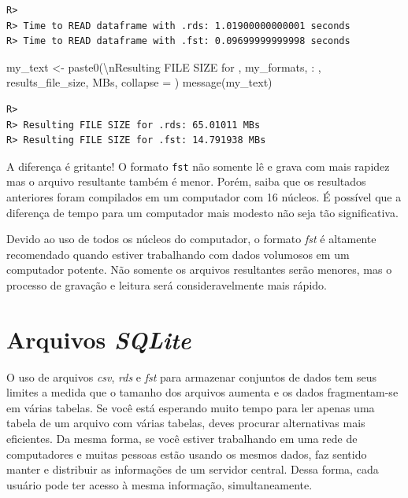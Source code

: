\documentclass[
  11pt,
]{book}
\newenvironment{Shaded}{\begin{snugshade}}{\end{snugshade}}
\newcommand{\AttributeTok}[1]{\textcolor[rgb]{0.61,0.61,0.61}{#1}}
\newcommand{\FunctionTok}[1]{\textcolor[rgb]{0,0,0}{#1}}
\newcommand{\NormalTok}[1]{#1}
\newcommand{\OtherTok}[1]{\textcolor[rgb]{0.37,0.37,0.37}{#1}}
\newcommand{\SpecialCharTok}[1]{\textcolor[rgb]{0,0,0}{#1}}
\newcommand{\StringTok}[1]{\textcolor[rgb]{0.5,0.5,0.5}{#1}}
\newenvironment{rmdimportant}
{\begin{importantblock}

	} {\end{importantblock}}
\begin{document}
\begin{verbatim}
R> 
R> Time to READ dataframe with .rds: 1.01900000000001 seconds
R> Time to READ dataframe with .fst: 0.09699999999998 seconds
\end{verbatim}

\begin{Shaded}
\begin{Highlighting}[]
\NormalTok{my\_text }\OtherTok{\textless{}{-}} \FunctionTok{paste0}\NormalTok{(}\StringTok{\textquotesingle{}}\SpecialCharTok{\textbackslash{}n}\StringTok{Resulting FILE SIZE for \textquotesingle{}}\NormalTok{,}
\NormalTok{                  my\_formats, }\StringTok{\textquotesingle{}: \textquotesingle{}}\NormalTok{,}
\NormalTok{                  results\_file\_size, }\StringTok{\textquotesingle{} MBs\textquotesingle{}}\NormalTok{, }\AttributeTok{collapse =} \StringTok{\textquotesingle{}\textquotesingle{}}\NormalTok{)}
\FunctionTok{message}\NormalTok{(my\_text)}
\end{Highlighting}
\end{Shaded}

\begin{verbatim}
R> 
R> Resulting FILE SIZE for .rds: 65.01011 MBs
R> Resulting FILE SIZE for .fst: 14.791938 MBs
\end{verbatim}

A diferença é gritante! O formato \texttt{fst} não somente lê e grava com mais rapidez mas o arquivo resultante também é menor. Porém, saiba que os resultados anteriores foram compilados em um computador com 16 núcleos. É possível que a diferença de tempo para um computador mais modesto não seja tão significativa.

\begin{rmdimportant}
Devido ao uso de todos os núcleos do computador, o formato \emph{fst} é
altamente recomendado quando estiver trabalhando com dados volumosos em
um computador potente. Não somente os arquivos resultantes serão
menores, mas o processo de gravação e leitura será consideravelmente
mais rápido.
\end{rmdimportant}

\hypertarget{arquivos-sqlite}{%
\section{\texorpdfstring{Arquivos \emph{SQLite}}{Arquivos SQLite}}\label{arquivos-sqlite}}

O uso de arquivos \emph{csv}, \emph{rds} e \emph{fst} para armazenar conjuntos de dados tem seus limites a medida que o tamanho dos arquivos aumenta e os dados fragmentam-se em várias tabelas. Se você está esperando muito tempo para ler apenas uma tabela de um arquivo com várias tabelas, deves procurar alternativas mais eficientes. Da mesma forma, se você estiver trabalhando em uma rede de computadores e muitas pessoas estão usando os mesmos dados, faz sentido manter e distribuir as informações de um servidor central. Dessa forma, cada usuário pode ter acesso à mesma informação, simultaneamente.
\end{document}
